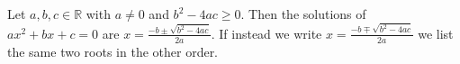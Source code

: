 Let $a, b, c \in \mathbb{R}$ with $a \neq 0$ and $b^{2} - 4ac \geq 0$.
Then the solutions of $ax^{2} + bx + c = 0$ are $x = \frac{-b \pm \sqrt{b^{2} - 4ac}}{2a}$.
If instead we write $x = \frac{-b \mp \sqrt{b^{2} - 4ac}}{2a}$ we list the same two roots in the other order.